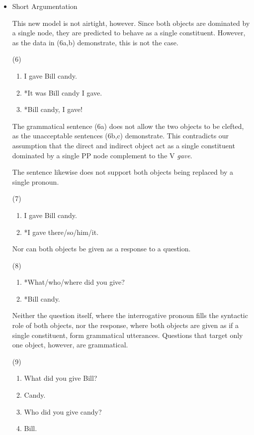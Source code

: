 \documentclass[12pt]{article}
\begin{document}
\begin{enumerate}
\begin{itemize}
\item Short Argumentation

This new model is not airtight, however. Since both objects are dominated by a single node, they are predicted to behave as a single constituent. However, as the data in (6a,b) demonstrate, this is not the case.

\item[(6)]
\begin{enumerate}[label=\alph*.]
\item I gave Bill candy.
\item *It was Bill candy I gave.
\item *Bill candy, I gave!
\end{enumerate}

The grammatical sentence (6a) does not allow the two objects to be clefted, as the unacceptable sentences (6b,c) demonstrate. This contradicts our assumption that the direct and indirect object act as a single constituent dominated by a single PP node complement to the V \emph{gave}.

The sentence likewise does not support both objects being replaced by a single pronoun.

\item[(7)]
\begin{enumerate}[label=\alph*.]
\item I gave Bill candy.
\item *I gave there/so/him/it.
\end{enumerate}

Nor can both objects be given as a response to a question.

\item[(8)]
\begin{enumerate}[label=\alph*.]
\item *What/who/where did you give?
\item *Bill candy.
\end{enumerate}

Neither the question itself, where the interrogative pronoun fills the syntactic role of both objects, nor the response, where both objects are given as if a single constituent, form grammatical utterances. Questions that target only one object, however, are grammatical.

\item[(9)]
\begin{enumerate}[label=\alph*.]
\item What did you give Bill?
\item Candy.
\item Who did you give candy?
\item Bill.
\end{enumerate}


\end{itemize}
\end{enumerate}
\end{document}
